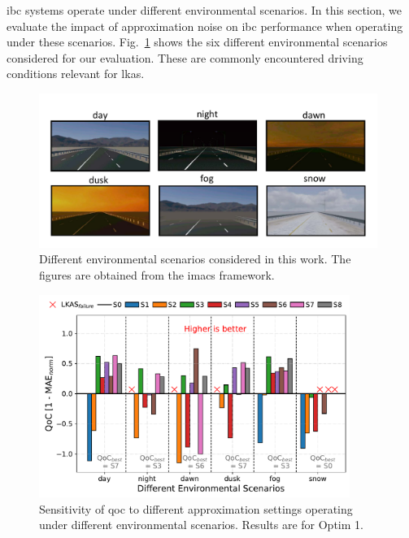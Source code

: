 \Gls{ibc} systems operate under different environmental scenarios. In this section, we evaluate the impact of approximation noise on \gls{ibc} performance when operating under these scenarios. Fig.~\ref{fig:env_1} shows the six different environmental scenarios considered for our evaluation. These are commonly encountered driving conditions relevant for \gls{lkas}. 
\begin{figure}[ht]
    \centering
    \includegraphics[width= 0.98\textwidth]{figs/scenes_v1.pdf}
    \caption{{Different environmental scenarios considered in this work. The figures are obtained from the \gls{imacs} framework.}}
    \label{fig:env_1}
    \vspace{-2em}
\end{figure}

\begin{figure}[ht]
    \centering
    \includegraphics[width= 0.9\textwidth]{figs/robustness2.pdf}
    \caption{{Sensitivity of \gls{qoc} to different approximation settings operating under different environmental scenarios. Results are for Optim 1.}}
    \label{fig:env_2}
    \vspace{-1em}
\end{figure}

